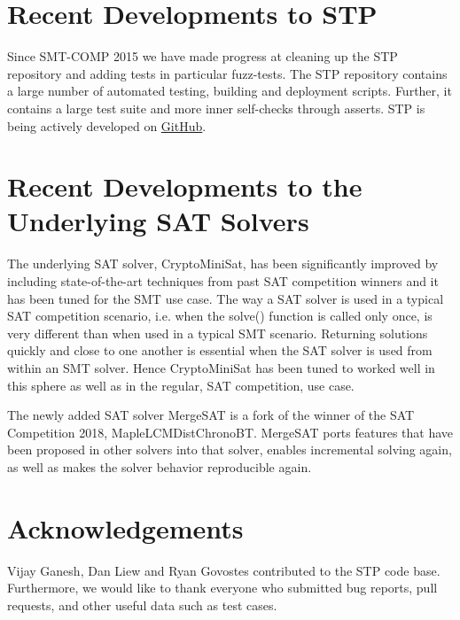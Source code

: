 \documentclass{llncs}
\begin{document}
\section{Recent Developments to STP}
Since SMT-COMP 2015 we have made progress at cleaning up the STP repository and adding tests in particular fuzz-tests.
The STP repository contains a large number of automated testing, building and deployment scripts.
Further, it contains a large test suite and more inner self-checks through asserts. STP is being actively developed on \href{https://github.com/stp/stp}{GitHub}.

\section{Recent Developments to the Underlying SAT Solvers}
The underlying SAT solver, CryptoMiniSat, has been significantly improved by including state-of-the-art techniques from past SAT competition winners and it has been tuned for the SMT use case.
The way a SAT solver is used in a typical SAT competition scenario, i.e. when the solve() function is called only once, is very different than when used in a typical SMT scenario.
Returning solutions quickly and close to one another is essential when the SAT solver is used from within an SMT solver.
Hence CryptoMiniSat has been tuned to worked well in this sphere as well as in the regular, SAT competition, use case.

The newly added SAT solver MergeSAT is a fork of the winner of the SAT Competition 2018, MapleLCMDistChronoBT.
MergeSAT ports features that have been proposed in other solvers into that solver, enables incremental solving again, as well as makes the solver behavior reproducible again.

\section*{Acknowledgements}
Vijay Ganesh, Dan Liew and Ryan Govostes contributed to the STP code base.
Furthermore, we would like to thank everyone who submitted bug reports, pull requests, and other useful data such as test cases.




\vfill
\pagebreak
\end{document}
